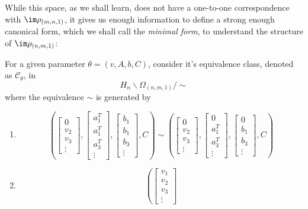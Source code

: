 \documentclass[11pt,letterpaper]{amsart}
\begin{document}
While this space, as we shall learn, does not have a one-to-one correspondence with $\im\rho_{(m, n, 1)}$, it gives us enough information to define a strong enough canonical form, which we shall call the \textit{minimal form}, to understand the structure of $\im \rho_{(n, m, 1)}$:
\begin{defin}\label{def:minimalform}
    \par For a given parameter $\theta =(v, A, b, C)$, consider it's equivalence class, denoted as $\mathcal{C}_{\theta}$, in 
    $$
    H_n \backslash \Omega_{(n, m, 1)}/\sim
    $$
    where the equivalence $\sim$ is generated by
    \begin{enumerate}
        \item 
    $$
    \left(\begin{bmatrix}
        0 \\ v_2 \\ v_3\\ \vdots
    \end{bmatrix}, \begin{bmatrix}
        a_1^T \\ a_1^T \\ a_3^T\\ \vdots
    \end{bmatrix}, \begin{bmatrix}
        b_1 \\ b_1 \\ b_3\\ \vdots
    \end{bmatrix}, C\right) \sim \left(\begin{bmatrix}
        0 \\ v_2 \\ v_3 \\  \vdots
    \end{bmatrix}, \begin{bmatrix}
        0 \\ a_1^T \\ a_3^T\\ \vdots
    \end{bmatrix}, \begin{bmatrix}
        0 \\ b_1 \\ b_3\\ \vdots
    \end{bmatrix}, C\right) 
    $$
        \item 
    $$
    \left(\begin{bmatrix}
        v_1 \\ v_2 \\ v_3\\ \vdots

\end{bmatrix}$$
\end{enumerate}
\end{defin}
\end{document}
